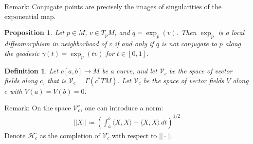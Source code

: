 \documentclass[11pt]{book}
\theoremstyle{break}
\theoremstyle{break}
\newtheorem{prop}[lem]{Proposition}
\newtheorem{defn}{Definition}[corL]
\newcommand{\remark}{\color{blue}Remark: \color{black}}
\begin{document}
\remark Conjugate points are precisely the images of singularities of the exponential map.

\begin{prop}
Let $p \in M$, $v \in T_pM$, and $q = \exp_p(v)$. Then $\exp_p$ is a local diffeomorphism in neighborhood of $v$ if and only if $q$ is not conjugate to $p$ along the geodesic $\gamma(t) = \exp_p(tv)$ for $t \in [0,1]$. 
\end{prop} 

\begin{defn}
Let $c[a,b]\to M$ be a curve, and let $\mathcal{V}_c$ be the space of vector fields along $c$, that is $\mathcal{V}_c = \Gamma(c^*TM)$. Let $\mathcal{V}_c^\circ$ be the space of vector fields $V$ along $c$ with $V(a) = V(b) = 0$.
\end{defn}

\remark On the space $\mathcal{V}_c^\circ$, one can introduce a norm:
\begin{align*}
||X|| \coloneqq\left( \int_{a}^b \langle \dot{X},\dot{X}\rangle + \langle X,X\rangle \, dt\right)^{1/2}
\end{align*}
Denote $\mathcal{H}_c^\circ$ as the completion of $\mathcal{V}_c^\circ$ with respect to $||\cdot ||$. 
\end{document}
